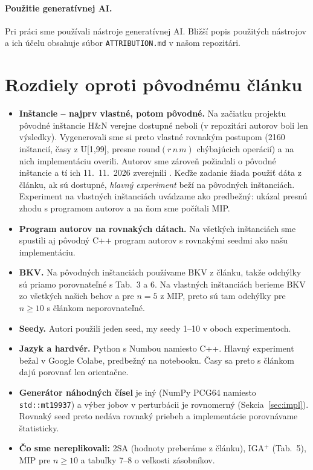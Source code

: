 \documentclass[11pt,a4paper]{article}
\begin{document}
\paragraph{Použitie generatívnej AI.} Pri práci sme používali nástroje generatívnej AI. Bližší popis použitých nástrojov a ich účelu obsahuje súbor {\texttt{ATTRIBUTION.md}} v našom repozitári.

\section{Rozdiely oproti pôvodnému článku}

\begin{itemize}
\item \textbf{Inštancie -- najprv vlastné, potom pôvodné.} Na začiatku projektu pôvodné
  inštancie H\&N verejne dostupné neboli (v repozitári autorov boli len výsledky). Vygenerovali
  sme si preto vlastné rovnakým postupom (2160 inštancií, časy z U[1,99], presne
  $\mathrm{round}(r\,n\,m)$ chýbajúcich operácií) a na nich implementáciu overili. Autorov sme
  zároveň požiadali o pôvodné inštancie a tí ich 11.~11.~2026 zverejnili \cite{RittRossit2024code}.
  Keďže zadanie žiada použiť dáta z článku, ak sú dostupné, \emph{hlavný experiment} beží na
  pôvodných inštanciách. Experiment na vlastných inštanciách uvádzame ako predbežný: ukázal
  presnú zhodu s programom autorov a na ňom sme počítali MIP.
\item \textbf{Program autorov na rovnakých dátach.} Na všetkých inštanciách sme spustili aj
  pôvodný C++ program autorov s rovnakými seedmi ako našu implementáciu.
\item \textbf{BKV.} Na pôvodných inštanciách používame BKV z článku, takže odchýlky sú priamo
  porovnateľné s Tab.~3 a 6. Na vlastných inštanciách berieme BKV zo všetkých našich behov
  a pre $n=5$ z MIP, preto sú tam odchýlky pre $n\ge 10$ s článkom neporovnateľné.
\item \textbf{Seedy.} Autori použili jeden seed, my seedy 1--10 v oboch experimentoch.
\item \textbf{Jazyk a hardvér.} Python s Numbou namiesto C++. Hlavný experiment bežal v Google
  Colabe, predbežný na notebooku. Časy sa preto s článkom dajú porovnať len orientačne.
\item \textbf{Generátor náhodných čísel} je iný (NumPy PCG64 namiesto \texttt{std::mt19937})
  a výber jobov v perturbácii je rovnomerný (Sekcia~\ref{sec:impl}). Rovnaký seed preto nedáva
  rovnaký priebeh a implementácie porovnávame štatisticky.
\item \textbf{Čo sme nereplikovali:} 2SA (hodnoty preberáme z článku), IGA$^+$ (Tab.~5), MIP
  pre $n\ge 10$ a tabuľky 7--8 o veľkosti zásobníkov.
\end{itemize}
\end{document}
